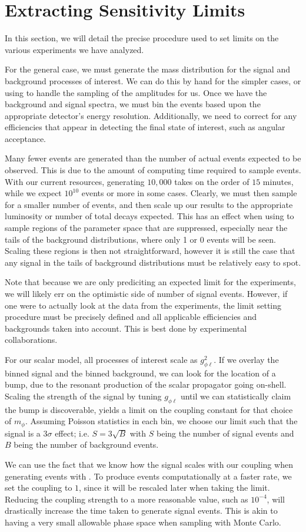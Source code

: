 \section{Extracting Sensitivity Limits}
\label{sec:limit_procedure}
In this section, we will detail the precise procedure used to set limits on the various experiments we have analyzed.

For the general case, we must generate the mass distribution for the signal and background processes of interest.
We can do this by hand for the simpler cases, or using \madgraph to handle the sampling of the amplitudes for us.
Once we have the background and signal spectra, we must bin the events based upon the appropriate detector's energy resolution.
Additionally, we need to correct for any efficiencies that appear in detecting the final state of interest, such as angular acceptance.

Many fewer events are generated than the number of actual events expected to be observed.
This is due to the amount of computing time required to sample events.
With our current resources, generating $10,000$ takes on the order of $15$ minutes, while we expect $10^{10}$ events or more in some cases.
Clearly, we must then sample for a smaller number of events, and then scale up our results to the appropriate luminosity or number of total decays expected.
This has an effect when using \madgraph to sample regions of the parameter space that are suppressed, especially near the tails of the background distributions, where only 1 or 0 events will be seen.
Scaling these regions is then not straightforward, however it is still the case that any signal in the tails of background distributions must be relatively easy to spot.

Note that because we are only prediciting an expected limit for the experiments, we will likely err on the optimistic side of number of signal events.
However, if one were to actually look at the data from the experiments, the limit setting procedure must be precisely defined and all applicable efficiencies and backgrounds taken into account.
This is best done by experimental collaborations.

For our scalar model, all processes of interest scale as $g_{\phi\ell}^2$.
If we overlay the binned signal and the binned background, we can look for the location of a bump, due to the resonant production of the scalar propagator going on-shell.
Scaling the strength of the signal by tuning $g_{\phi\ell}$ until we can statistically claim the bump is discoverable, yields a limit on the coupling constant for that choice of $m_\phi$.
Assuming Poisson statistics in each bin, we choose our limit such that the signal is a $3\sigma$ effect; i.e. $S = 3\sqrt{B}$ with $S$ being the number of signal events and $B$ being the number of background events.

We can use the fact that we know how the signal scales with our coupling when generating events with \madgraph.
To produce events computationally at a faster rate, we set the coupling to $1$, since it will be rescaled later when taking the limit.
Reducing the coupling strength to a more reasonable value, such as $10^{-4}$, will drastically increase the time taken to generate signal events.
This is akin to having a very small allowable phase space when sampling with Monte Carlo.

